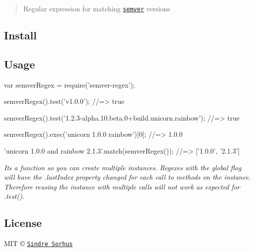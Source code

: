 \begin{quote}
Regular expression for matching \href{https://github.com/isaacs/node-semver}{\tt semver} versions \end{quote}


\subsection*{Install}




\subsection*{Usage}


\begin{DoxyCode}
var semverRegex = require('semver-regex');

semverRegex().test('v1.0.0');
//=> true

semverRegex().test('1.2.3-alpha.10.beta.0+build.unicorn.rainbow');
//=> true

semverRegex().exec('unicorn 1.0.0 rainbow')[0];
//=> 1.0.0

'unicorn 1.0.0 and rainbow 2.1.3'.match(semverRegex());
//=> ['1.0.0', '2.1.3']
\end{DoxyCode}


{\itshape It\textquotesingle{}s a function so you can create multiple instances. Regexes with the global flag will have the {\ttfamily .last\+Index} property changed for each call to methods on the instance. Therefore reusing the instance with multiple calls will not work as expected for {\ttfamily .test()}.}

\subsection*{License}

M\+IT © \href{http://sindresorhus.com}{\tt Sindre Sorhus} 